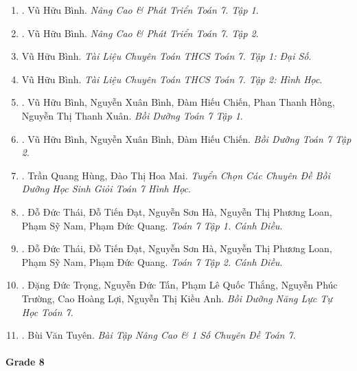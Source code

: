 \documentclass{article}
\begin{document}
\begin{enumerate}
	\item \cite{Binh_Toan_7_tap_1}. Vũ Hữu Bình. {\it Nâng Cao \& Phát Triển Toán 7. Tập 1}.\hfill{\sf[done]}
	\item \cite{Binh_Toan_7_tap_2}. Vũ Hữu Bình. {\it Nâng Cao \& Phát Triển Toán 7. Tập 2}.\hfill{\sf[done]}
	\item Vũ Hữu Bình. {\it Tài Liệu Chuyên Toán THCS Toán 7. Tập 1: Đại Số}.
	\item Vũ Hữu Bình. {\it Tài Liệu Chuyên Toán THCS Toán 7. Tập 2: Hình Học}.
	\item \cite{Binh_boi_duong_Toan_7_tap_1}. Vũ Hữu Bình, Nguyễn Xuân Bình, Đàm Hiếu Chiến, Phan Thanh Hồng, Nguyễn Thị Thanh Xuân. {\it Bồi Dưỡng Toán 7 Tập 1}.\hfill{\sf[reading]}
	\item \cite{Binh_boi_duong_Toan_7_tap_2}. Vũ Hữu Bình, Nguyễn Xuân Bình, Đàm Hiếu Chiến. {\it Bồi Dưỡng Toán 7 Tập 2}.\hfill{\sf[reading]}
	\item \cite{Hung_Mai_Toan_7_hinh_hoc}. Trần Quang Hùng, Đào Thị Hoa Mai. {\it Tuyển Chọn Các Chuyên Đề Bồi Dưỡng Học Sinh Giỏi Toán 7 Hình Học}.
	\item \cite{SGK_Toan_7_Canh_Dieu_tap_1}. Đỗ Đức Thái, Đỗ Tiến Đạt, Nguyễn Sơn Hà, Nguyễn Thị Phương Loan, Phạm Sỹ Nam, Phạm Đức Quang. {\it Toán 7 Tập 1. Cánh Diều}.\hfill{\sf[done]}
	\item \cite{SGK_Toan_7_Canh_Dieu_tap_2}. Đỗ Đức Thái, Đỗ Tiến Đạt, Nguyễn Sơn Hà, Nguyễn Thị Phương Loan, Phạm Sỹ Nam, Phạm Đức Quang. {\it Toán 7 Tập 2. Cánh Diều}.\hfill{\sf[done]}
	\item \cite{Trong_Toan_7}. Đặng Đức Trọng, Nguyễn Đức Tấn, Phạm Lê Quốc Thắng, Nguyễn Phúc Trường, Cao Hoàng Lợi, Nguyễn Thị Kiều Anh. {\it Bồi Dưỡng Năng Lực Tự Học Toán 7}.\hfill{\sf[reading]}
	\item \cite{Tuyen_Toan_7}. Bùi Văn Tuyên. {\it Bài Tập Nâng Cao \& 1 Số Chuyên Đề Toán 7}.\hfill{\sf[done]}
\end{enumerate}

\paragraph{Grade 8}
\end{document}
